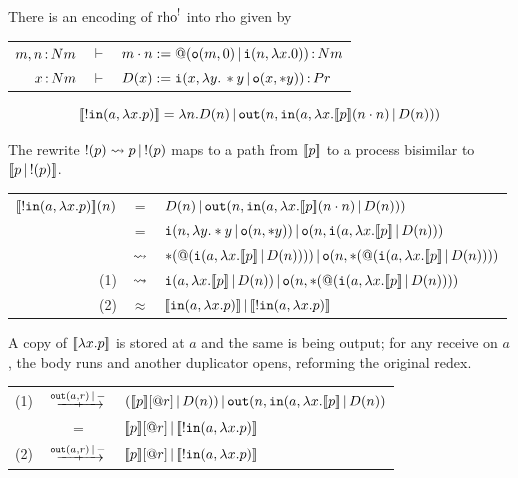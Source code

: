 \documentclass{article}
\begin{document}
\begin{proposition}
    There is an encoding of $\mathrm{rho}^{!}$ into rho given by
    \begin{center}
        \renewcommand{\arraystretch}{1.2}
        \begin{tabular}{rcl}
            $m,n\,{:}\, Nm$ & $\vdash$ & $m\cdot n := @(\mathtt{o}(m,0)\,|\, \mathtt{i}(n,\lambda x.0))\,{:}\, Nm$\\
            $x\,{:}\, Nm$ & $\vdash$ & $D(x) := \mathtt{i}(x,\lambda y.\, \ast y \,|\, \mathtt{o}(x,\ast y))\,{:}\, Pr$
        \end{tabular}
    \end{center}
    \[[\![!\mathtt{in}(a,\lambda x.p)]\!] = \lambda n. D(n)\,|\, \mathtt{out}(n, \mathtt{in}(a, \lambda x. [\![p]\!](n\cdot n)\,|\, D(n)))\]
\end{proposition}

The rewrite $!(p)\rightsquigarrow p\,|\, !(p)$ maps to a path from $[\![p]\!]$ to a process bisimilar to $[\![p\,|\, !(p)]\!]$.

\begin{center}
\renewcommand{\arraystretch}{1.2}
    \begin{tabular}{rcl}
         $[\![!\mathtt{in}(a,\lambda x.p)]\!](n)$ & $=$ & $D(n)\,|\, \mathtt{out}(n, \mathtt{in}(a, \lambda x. [\![p]\!](n\cdot n)\,|\, D(n)))$\\
         & $=$ & $\mathtt{i}(n,\lambda y. \ast y\,|\, \mathtt{o}(n,\ast y))\,|\, \mathtt{o}(n,\mathtt{i}(a, \lambda x.[\![p]\!]\,|\, D(n)))$\\
         & $\rightsquigarrow$ & $\ast(@(\mathtt{i}(a,\lambda x.[\![p]\!]\,|\, D(n))))\,|\, \mathtt{o}(n,\ast(@(\mathtt{i}(a,\lambda x. [\![p]\!]\,|\, D(n))))$\\
         (1) & $\rightsquigarrow$ & $\mathtt{i}(a,\lambda x.[\![p]\!]\,|\, D(n))\,|\, \mathtt{o}(n,\ast(@(\mathtt{i}(a,\lambda x. [\![p]\!]\,|\, D(n))))$\\
         (2) & $\approx$ & $[\![\mathtt{in}(a,\lambda x.p)]\!]\,|\, [\![!\mathtt{in}(a,\lambda x.p)]\!]$
    \end{tabular}
\end{center}

A copy of $[\![\lambda x.p]\!]$ is stored at $a$ and the same is being output; for any receive on $a$, the body runs and another duplicator opens, reforming the original redex.

\begin{center}
    \renewcommand{\arraystretch}{1.2}
    \begin{tabular}{rcl}
         (1) & $\xr{\mtt{out}(a,r)\pr -}$ & $([\![p]\!][@r]\,|\, D(n))\,|\, \mathtt{out}(n,\mathtt{in}(a,\lambda x.[\![p]\!]\,|\, D(n))$\\
         & $=$ & $[\![p]\!][@r]\,|\, [\![!\mathtt{in}(a,\lambda x.p)]\!]$\\
         (2) & $\xr{\mtt{out}(a,r)\pr -}$ & $[\![p]\!][@r]\,|\, [\![!\mathtt{in}(a,\lambda x.p)]\!]$
    \end{tabular}
\end{center}
\end{document}
